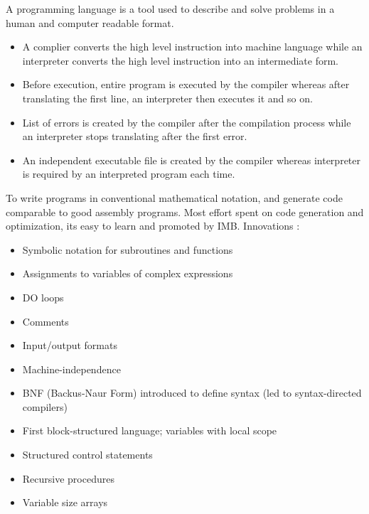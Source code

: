 \documentclass[a4paper,11pt]{article}
\begin{document}
\begin{tcolorbox}[title = What\, exactly\, is a programming language ?]
  A programming language is a tool used to describe and solve problems in a
  human and computer readable format.
\end{tcolorbox}
\begin{tcolorbox}[title=How do compilers and interpreters differ ?]
  \begin{itemize}
\item A complier converts the high level instruction into machine language while
  an interpreter converts the high level instruction into an intermediate form.
\item Before execution, entire program is executed by the compiler whereas after
  translating the first line, an interpreter then executes it and so on.
\item List of errors is created by the compiler after the compilation process
  while an interpreter stops translating after the first error.
\item An independent executable file is created by the compiler whereas
  interpreter is required by an interpreted program each time.
\end{itemize}
\end{tcolorbox}
\begin{tcolorbox}[title=Why was FORTRAN developed ?]
  To write programs in conventional mathematical notation, and generate code
  comparable to good assembly programs. Most effort spent on code generation and
  optimization, its easy to learn and promoted by IMB. Innovations :
  \begin{itemize}
  \item Symbolic notation for subroutines and functions
  \item Assignments to variables of complex expressions
  \item DO loops
  \item Comments
  \item Input/output formats
  \item Machine-independence
  \end{itemize}
\end{tcolorbox}
\begin{tcolorbox}[title=What were the main achievements of ALGOL 60?]
  \begin{itemize}
  \item BNF (Backus-Naur Form) introduced to define syntax (led to syntax-directed compilers)
  \item First block-structured language; variables with local scope
  \item Structured control statements
  \item Recursive procedures
  \item Variable size arrays
  \end{itemize}
\end{tcolorbox}
\end{document}
